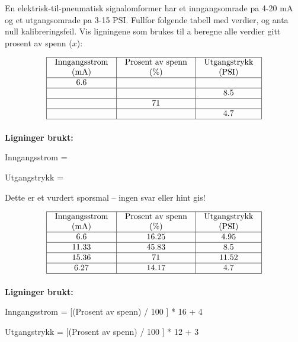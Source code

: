

En elektrisk-til-pneumatisk signalomformer har et inngangsomrade pa 4-20 mA og et utgangsomrade pa 3-15 PSI.  Fullfor folgende tabell med verdier, og anta null kalibreringsfeil.  Vis ligningene som brukes til a beregne alle verdier gitt prosent av spenn ($x$):


$$\vbox{\offinterlineskip
\halign{\strut
\vrule \quad\hfil # \ \hfil & 
\vrule \quad\hfil # \ \hfil & 
\vrule \quad\hfil # \ \hfil \vrule \cr
\noalign{\hrule}
%
Inngangsstrom & Prosent av spenn & Utgangstrykk \cr
%
(mA) & (\%) & (PSI) \cr
%
\noalign{\hrule}
%
6.6 &  &  \cr
%
\noalign{\hrule}
%
 &  & 8.5 \cr
%
\noalign{\hrule}
%
 & 71 &  \cr
%
\noalign{\hrule}
%
 &  & 4.7 \cr
%
\noalign{\hrule}
} %
}$$ %

\vskip 10pt

\noindent
{\bf Ligninger brukt:}

\vskip 20pt

Inngangsstrom = 

\vskip 20pt

Utgangstrykk = 

\vfil

\eject






Dette er et vurdert sporsmal -- ingen svar eller hint gis!








$$\vbox{\offinterlineskip
\halign{\strut
\vrule \quad\hfil # \ \hfil & 
\vrule \quad\hfil # \ \hfil & 
\vrule \quad\hfil # \ \hfil \vrule \cr
\noalign{\hrule}
%
Inngangsstrom & Prosent av spenn & Utgangstrykk \cr
%
(mA) & (\%) & (PSI) \cr
%
\noalign{\hrule}
%
6.6 & 16.25 & 4.95 \cr
%
\noalign{\hrule}
%
11.33 & 45.83 & 8.5 \cr
%
\noalign{\hrule}
%
15.36 & 71 & 11.52 \cr
%
\noalign{\hrule}
%
6.27 & 14.17 & 4.7 \cr
%
\noalign{\hrule}
} %
}$$ %

\vskip 10pt

\noindent
{\bf Ligninger brukt:}

\vskip 20pt

Inngangsstrom = [(Prosent av spenn) / 100 ] * 16 + 4

\vskip 20pt

Utgangstrykk = [(Prosent av spenn) / 100 ] * 12 + 3





